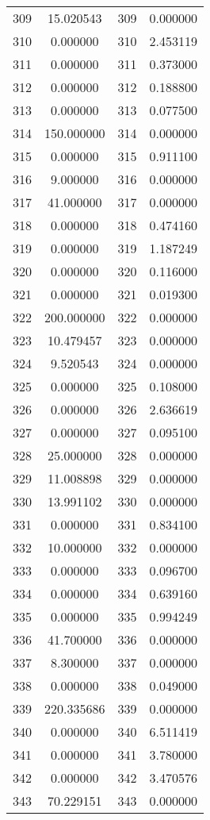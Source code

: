 \documentclass[12pt]{article}
\begin{document}
\begin{longtable}{@{}cccc@{}}
309 & 15.020543 & 309 & 0.000000 \\
310 & 0.000000 & 310 & 2.453119 \\
311 & 0.000000 & 311 & 0.373000 \\
312 & 0.000000 & 312 & 0.188800 \\
313 & 0.000000 & 313 & 0.077500 \\
314 & 150.000000 & 314 & 0.000000 \\
315 & 0.000000 & 315 & 0.911100 \\
316 & 9.000000 & 316 & 0.000000 \\
317 & 41.000000 & 317 & 0.000000 \\
318 & 0.000000 & 318 & 0.474160 \\
319 & 0.000000 & 319 & 1.187249 \\
320 & 0.000000 & 320 & 0.116000 \\
321 & 0.000000 & 321 & 0.019300 \\
322 & 200.000000 & 322 & 0.000000 \\
323 & 10.479457 & 323 & 0.000000 \\
324 & 9.520543 & 324 & 0.000000 \\
325 & 0.000000 & 325 & 0.108000 \\
326 & 0.000000 & 326 & 2.636619 \\
327 & 0.000000 & 327 & 0.095100 \\
328 & 25.000000 & 328 & 0.000000 \\
329 & 11.008898 & 329 & 0.000000 \\
330 & 13.991102 & 330 & 0.000000 \\
331 & 0.000000 & 331 & 0.834100 \\
332 & 10.000000 & 332 & 0.000000 \\
333 & 0.000000 & 333 & 0.096700 \\
334 & 0.000000 & 334 & 0.639160 \\
335 & 0.000000 & 335 & 0.994249 \\
336 & 41.700000 & 336 & 0.000000 \\
337 & 8.300000 & 337 & 0.000000 \\
338 & 0.000000 & 338 & 0.049000 \\
339 & 220.335686 & 339 & 0.000000 \\
340 & 0.000000 & 340 & 6.511419 \\
341 & 0.000000 & 341 & 3.780000 \\
342 & 0.000000 & 342 & 3.470576 \\
343 & 70.229151 & 343 & 0.000000 \\

\end{longtable}
\end{document}
